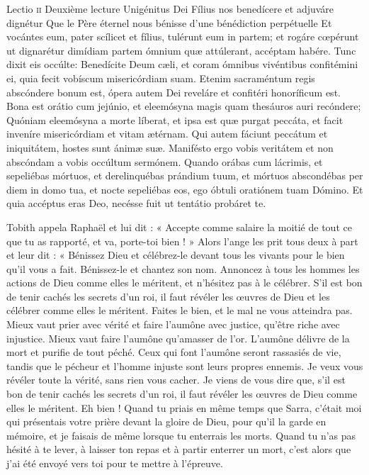 \documentclass[twoside]{article}
\begin{document}
\begin{paracol}[1]{2}
\lectioresponsorium
	{Lectio \textsc{ii}}
	{Deuxième lecture}
	{Unigénitus Dei Fílius nos benedícere et adjuváre dignétur}
	{Que le Père éternel nous bénisse d'une bénédiction perpétuelle}
	{
		Et vocántes eum, pater scílicet et fílius, tulérunt eum in partem; et rogáre cœpérunt ut dignarétur dimídiam partem ómnium quæ attúlerant, accéptam habére.
		Tunc dixit eis occúlte: Benedícite Deum cæli, et coram ómnibus vivéntibus confitémini ei, quia fecit vobíscum misericórdiam suam.
		Etenim sacraméntum regis abscóndere bonum est, ópera autem Dei reveláre et confitéri honoríficum est.
		Bona est orátio cum jejúnio, et eleemósyna magis quam thesáuros auri recóndere;
		Quóniam eleemósyna a morte líberat, et ipsa est quæ purgat peccáta, et facit inveníre misericórdiam et vitam ætérnam.
		Qui autem fáciunt peccátum et iniquitátem, hostes sunt ánimæ suæ.
		Manifésto ergo vobis veritátem et non abscóndam a vobis occúltum sermónem.
		Quando orábas cum lácrimis, et sepeliébas mórtuos, et derelinquébas prándium tuum, 
		et mórtuos abscondébas per diem in domo tua, et nocte sepeliébas eos, ego óbtuli oratiónem tuam Dómino.
		Et quia accéptus eras Deo, necésse fuit ut tentátio probáret te.
	}
	{	
	
		Tobith appela Raphaël et lui dit : « Accepte comme salaire la moitié de tout ce que tu as rapporté, et va, porte-toi bien ! »
		Alors l’ange les prit tous deux à part et leur dit :
		« Bénissez Dieu et célébrez-le devant tous les vivants pour le bien qu’il vous a fait. Bénissez-le et chantez son nom. 
		Annoncez à tous les hommes les actions de Dieu comme elles le méritent, et n’hésitez pas à le célébrer.
		S’il est bon de tenir cachés les secrets d’un roi, il faut révéler les œuvres de Dieu et les célébrer comme elles le méritent. Faites le bien, et le mal ne vous atteindra pas.
		Mieux vaut prier avec vérité et faire l’aumône avec justice, qu’être riche avec injustice. Mieux vaut faire l’aumône qu’amasser de l’or.
		L’aumône délivre de la mort et purifie de tout péché. Ceux qui font l’aumône seront rassasiés de vie,
		tandis que le pécheur et l’homme injuste sont leurs propres ennemis.
		Je veux vous révéler toute la vérité, sans rien vous cacher. 
		Je viens de vous dire que, s’il est bon de tenir cachés les secrets d’un roi, il faut révéler les œuvres de Dieu comme elles le méritent.
		Eh bien ! Quand tu priais en même temps que Sarra, 
		c’était moi qui présentais votre prière devant la gloire de Dieu, pour qu’il la garde en mémoire, et je faisais de même lorsque tu enterrais les morts.
		Quand tu n’as pas hésité à te lever, à laisser ton repas et à partir enterrer un mort, c’est alors que j’ai été envoyé vers toi pour te mettre à l’épreuve.
	
}
\end{paracol}
\end{document}
